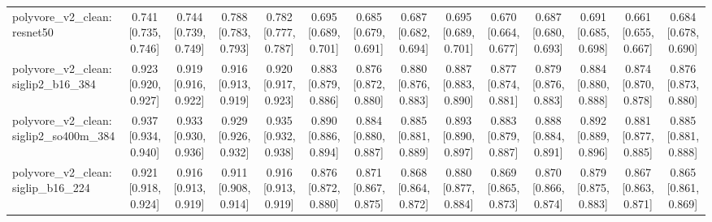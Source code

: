 \begin{table}[t]
\begin{tabular}{lccccccccccccc}
polyvore\_v2\_clean: resnet50 & 0.741 [0.735, 0.746] & 0.744 [0.739, 0.749] & 0.788 [0.783, 0.793] & 0.782 [0.777, 0.787] & 0.695 [0.689, 0.701] & 0.685 [0.679, 0.691] & 0.687 [0.682, 0.694] & 0.695 [0.689, 0.701] & 0.670 [0.664, 0.677] & 0.687 [0.680, 0.693] & 0.691 [0.685, 0.698] & 0.661 [0.655, 0.667] & 0.684 [0.678, 0.690] \\
polyvore\_v2\_clean: siglip2\_b16\_384 & 0.923 [0.920, 0.927] & 0.919 [0.916, 0.922] & 0.916 [0.913, 0.919] & 0.920 [0.917, 0.923] & 0.883 [0.879, 0.886] & 0.876 [0.872, 0.880] & 0.880 [0.876, 0.883] & 0.887 [0.883, 0.890] & 0.877 [0.874, 0.881] & 0.879 [0.876, 0.883] & 0.884 [0.880, 0.888] & 0.874 [0.870, 0.878] & 0.876 [0.873, 0.880] \\
polyvore\_v2\_clean: siglip2\_so400m\_384 & 0.937 [0.934, 0.940] & 0.933 [0.930, 0.936] & 0.929 [0.926, 0.932] & 0.935 [0.932, 0.938] & 0.890 [0.886, 0.894] & 0.884 [0.880, 0.887] & 0.885 [0.881, 0.889] & 0.893 [0.890, 0.897] & 0.883 [0.879, 0.887] & 0.888 [0.884, 0.891] & 0.892 [0.889, 0.896] & 0.881 [0.877, 0.885] & 0.885 [0.881, 0.888] \\
polyvore\_v2\_clean: siglip\_b16\_224 & 0.921 [0.918, 0.924] & 0.916 [0.913, 0.919] & 0.911 [0.908, 0.914] & 0.916 [0.913, 0.919] & 0.876 [0.872, 0.880] & 0.871 [0.867, 0.875] & 0.868 [0.864, 0.872] & 0.880 [0.877, 0.884] & 0.869 [0.865, 0.873] & 0.870 [0.866, 0.874] & 0.879 [0.875, 0.883] & 0.867 [0.863, 0.871] & 0.865 [0.861, 0.869] \\
\bottomrule\end{tabular}
\end{table}
